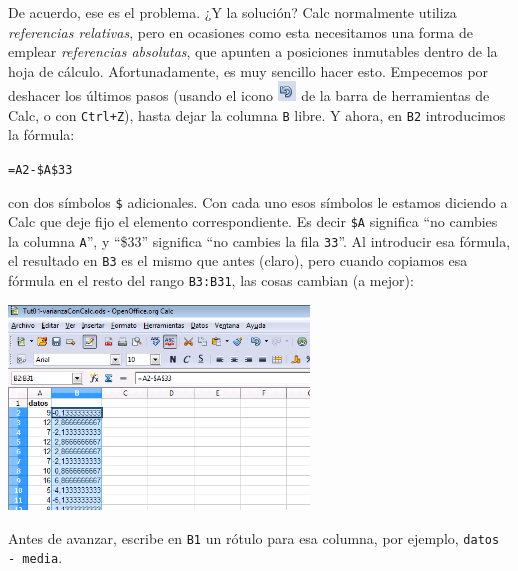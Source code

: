 \documentclass[10pt,a4paper]{article}\usepackage[]{graphicx}\usepackage[]{color}
\begin{document}
De acuerdo, ese es el problema. ¿Y la solución? Calc normalmente utiliza {\em referencias relativas}, pero en ocasiones como esta necesitamos una forma de emplear {\em referencias absolutas}, que apunten a posiciones inmutables dentro de la hoja de cálculo. Afortunadamente, es muy sencillo hacer esto. Empecemos por deshacer los últimos pasos (usando el icono \includegraphics[width=0.5cm]{../fig/Tut02-49.png} de la barra de herramientas de Calc, o con {\tt Ctrl+Z}), hasta dejar la columna {\tt B} libre. Y ahora, en {\tt B2} introducimos la fórmula:
\begin{center}
{\tt =A2-\$A\$33}
\end{center}
con dos símbolos {\tt\$} adicionales. Con cada uno esos símbolos le estamos diciendo a Calc que deje fijo el elemento correspondiente. Es decir {\tt\$A} significa ``no cambies la columna {\tt A}'', y ``\$33'' significa ``no cambies la fila {\tt 33}''. Al introducir esa fórmula, el resultado en {\tt B3} es el mismo que antes (claro), pero cuando copiamos esa fórmula en el resto del rango {\tt B3:B31}, las cosas cambian (a mejor):
    \begin{center}
    \includegraphics[width=8cm]{../fig/Tut02-50.png}
    \end{center}
Antes de avanzar, escribe en {\tt B1} un rótulo para esa columna, por ejemplo, {\tt datos - media}.
\end{document}
